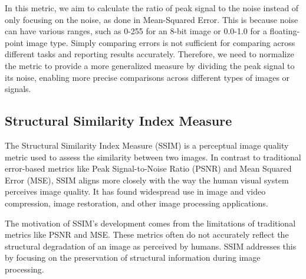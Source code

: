 In this metric, we aim to calculate the ratio of peak signal to the noise instead of only focusing on the noise, as done in Mean-Squared Error. This is because noise can have various ranges, such as 0-255 for an 8-bit image or 0.0-1.0 for a floating-point image type. Simply comparing errors is not sufficient for comparing across different tasks and reporting results accurately. Therefore, we need to normalize the metric to provide a more generalized measure by dividing the peak signal to its noise, enabling more precise comparisons across different types of images or signals.




\subsection{Structural Similarity Index Measure}
The Structural Similarity Index Measure (SSIM) is a perceptual image quality metric used to assess the similarity between two images. In contrast to traditional error-based metrics like Peak Signal-to-Noise Ratio (PSNR) and Mean Squared Error (MSE), SSIM aligns more closely with the way the human visual system perceives image quality. It has found widespread use in image and video compression, image restoration, and other image processing applications.

The motivation of SSIM's development comes from the limitations of traditional metrics like PSNR and MSE. These metrics often do not accurately reflect the structural degradation of an image as perceived by humans. SSIM addresses this by focusing on the preservation of structural information during image processing.


